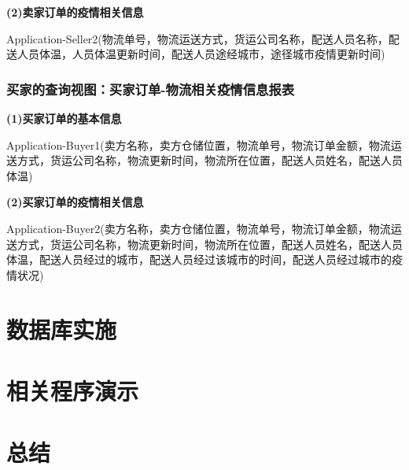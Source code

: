 \documentclass[12pt]{article}
\begin{document}
\vspace{0.3cm}
\noindent \textbf{(2)卖家订单的疫情相关信息} \par 
\noindent Application-Seller2(物流单号，物流运送方式，货运公司名称，配送人员名称，配送人员体温，人员体温更新时间，配送人员途经城市，途径城市疫情更新时间)

\subsubsection{买家的查询视图：买家订单-物流相关疫情信息报表}

\noindent \textbf{(1)买家订单的基本信息} \par 
\noindent Application-Buyer1(卖方名称，卖方仓储位置，物流单号，物流订单金额，物流运送方式，货运公司名称，物流更新时间，物流所在位置，配送人员姓名，配送人员体温)

\vspace{0.3cm}
\noindent \textbf{(2)买家订单的疫情相关信息} \par 
\noindent Application-Buyer2(卖方名称，卖方仓储位置，物流单号，物流订单金额，物流运送方式，货运公司名称，物流更新时间，物流所在位置，配送人员姓名，配送人员体温，配送人员经过的城市，配送人员经过该城市的时间，配送人员经过城市的疫情状况)

\section{数据库实施}
\section{相关程序演示}
\section{总结}
\end{document}
